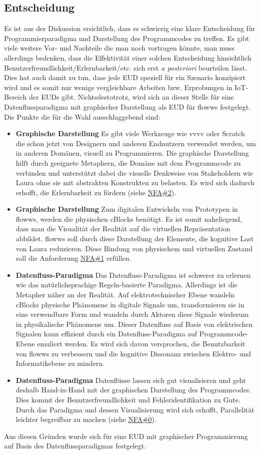 \subsection{Entscheidung}
Es ist aus der Diskussion ersichtlich, dass es schwierig eine klare Entscheidung für Programmierparadigma und Darstellung des Programmcodes zu treffen. Es gibt viele weitere Vor- und Nachteile die man noch vortragen könnte, man muss allerdings bedenken, dass die Effektivität einer solchen Entscheidung hinsichtlich Benutzerfreundlichkeit/Erlernbarkeit/etc. sich erst \textit{a posteriori} beurteilen lässt. Dies hat auch damit zu tun, dass jede \ac{EUD} speziell für ein Szenario konzipiert wird und es somit nur wenige vergleichbare Arbeiten bzw. Erprobungen in \ac{IoT}-Bereich der \acp{EUD} gibt. Nichtsdestotrotz, wird sich an dieser Stelle für eine Datenflussparadigma mit graphischer Darstellung als \ac{EUD} für flowws festgelegt. Die Punkte die für die Wahl ausschlaggebend sind:
\begin{itemize}
    \item \textbf{Graphische Darstellung} Es gibt viele Werkzeuge wie vvvv oder Scratch die schon jetzt von Designern und anderen Endnutzern verwendet werden, um in anderen Domänen, visuell zu Programmieren. Die graphische Darstellung hilft durch geeignete Metaphern, die Domäne mit dem Programmcode zu verbinden und unterstützt dabei die visuelle Denkweise von Stakeholdern wie Laura ohne sie mit abstrakten Konstrukten zu belasten. Es wird sich dadurch erhofft, die Erlernbarkeit zu fördern (siehe \hyperref[tab:NFA2]{NFA\#2}).
    \item \textbf{Graphische Darstellung} Zum digitalen Entwickeln von Prototypen in flowws, werden die physischen cBlocks benötigt. Es ist somit naheliegend, dass man die Visualität der Realität auf die virtuellen Repräsentation abbildet. flowws soll durch diese Darstellung der Elemente,  die kognitive Last von Laura reduzieren. Diese Bindung von physischem und virtuellen Zustand soll die Anforderung  \hyperref[tab:NFA1]{NFA\#1} erfüllen.
    \item \textbf{Datenfluss-Paradigma} Das Datenfluss-Paradigma ist schwerer zu erlernen wie das natürlichsprachige Regeln-basierte Paradigma. Allerdings ist die Metapher näher an der Realität. Auf elektrotechnischer Ebene wandeln cBlocks physische Phänomene in digitale Signale um, transformieren sie in eine verwendbare Form und wandeln durch Aktoren diese Signale wiederum in physikalische Phänomene um. Dieser Datenfluss auf Basis von elektrischen Signalen kann effizient durch ein Datenfluss-Paradigma auf Programmcode-Ebene emuliert werden. Es wird sich davon versprochen, die Benutzbarkeit von flowws zu verbessern und die kognitive Dissonanz zwischen Elektro- und Informatikebene zu mindern.
    \item \textbf{Datenfluss-Paradigma} Datenflüsse lassen sich gut visualisieren und  geht deshalb Hand-in-Hand mit der graphischen Darstellung des Programmcodes. Dies kommt der Benutzerfreundlichkeit und Fehleridentifikation zu Gute. Durch das Paradigma und dessen Visualisierung wird sich erhofft, Parallelität leichter begreifbar zu machen (siehe \hyperref[tab:NFA0]{NFA\#0}).
\end{itemize}

Aus diesen Gründen wurde sich für eine \ac{EUD} mit graphischer Programmierung auf Basis des Datenflussparadigmas festgelegt.
